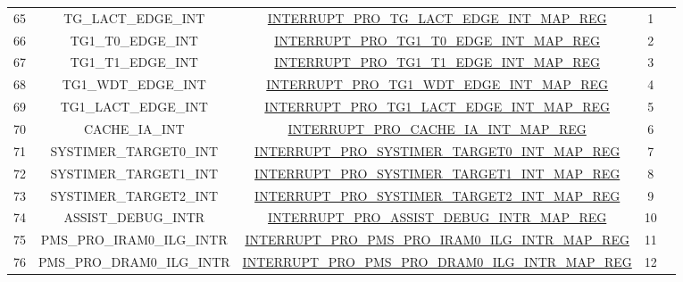\begin{footnotesize}
\begin{longtable}[c]{|*{5}{c|}}
    65 &TG\_LACT\_EDGE\_INT  &\hyperref[regdesc:INTERRUPTPROTGLACTEDGEINTMAPREG]{INTERRUPT\_PRO\_TG\_LACT\_EDGE\_INT\_MAP\_REG}  &1  &                          	\\
    \cline{1-4}
    66 &TG1\_T0\_EDGE\_INT  &\hyperref[regdesc:INTERRUPTPROTG1T0EDGEINTMAPREG]{INTERRUPT\_PRO\_TG1\_T0\_EDGE\_INT\_MAP\_REG}  &2  &                          	\\
    \cline{1-4}
    67 &TG1\_T1\_EDGE\_INT  &\hyperref[regdesc:INTERRUPTPROTG1T1EDGEINTMAPREG]{INTERRUPT\_PRO\_TG1\_T1\_EDGE\_INT\_MAP\_REG}  &3  &                          	\\
    \cline{1-4}
    68 &TG1\_WDT\_EDGE\_INT  &\hyperref[regdesc:INTERRUPTPROTG1WDTEDGEINTMAPREG]{INTERRUPT\_PRO\_TG1\_WDT\_EDGE\_INT\_MAP\_REG}  &4  &                          	\\
    \cline{1-4}
    69 &TG1\_LACT\_EDGE\_INT  &\hyperref[regdesc:INTERRUPTPROTG1LACTEDGEINTMAPREG]{INTERRUPT\_PRO\_TG1\_LACT\_EDGE\_INT\_MAP\_REG}  &5  &                          	\\
    \cline{1-4}
    70 &CACHE\_IA\_INT  &\hyperref[regdesc:INTERRUPTPROCACHEIAINTMAPREG]{INTERRUPT\_PRO\_CACHE\_IA\_INT\_MAP\_REG}  &6  &                          	\\
    \cline{1-4}
    71 &SYSTIMER\_TARGET0\_INT  &\hyperref[regdesc:INTERRUPTPROSYSTIMERTARGET0INTMAPREG]{INTERRUPT\_PRO\_SYSTIMER\_TARGET0\_INT\_MAP\_REG}  &7  &                          	\\
    \hline
    72 &SYSTIMER\_TARGET1\_INT  &\hyperref[regdesc:INTERRUPTPROSYSTIMERTARGET1INTMAPREG]{INTERRUPT\_PRO\_SYSTIMER\_TARGET1\_INT\_MAP\_REG}  &8  &                          	\\
    \cline{1-4}
    73 &SYSTIMER\_TARGET2\_INT  &\hyperref[regdesc:INTERRUPTPROSYSTIMERTARGET2INTMAPREG]{INTERRUPT\_PRO\_SYSTIMER\_TARGET2\_INT\_MAP\_REG}  &9  &                          	\\
    \cline{1-4}
    74 &ASSIST\_DEBUG\_INTR  &\hyperref[regdesc:INTERRUPTPROASSISTDEBUGINTRMAPREG]{INTERRUPT\_PRO\_ASSIST\_DEBUG\_INTR\_MAP\_REG}  &10  &                          	\\
    \cline{1-4}
    75 &PMS\_PRO\_IRAM0\_ILG\_INTR  &\hyperref[regdesc:INTERRUPTPROPMSPROIRAM0ILGINTRMAPREG]{INTERRUPT\_PRO\_PMS\_PRO\_IRAM0\_ILG\_INTR\_MAP\_REG}  &11  &                          	\\
    \cline{1-4}
    76 &PMS\_PRO\_DRAM0\_ILG\_INTR  &\hyperref[regdesc:INTERRUPTPROPMSPRODRAM0ILGINTRMAPREG]{INTERRUPT\_PRO\_PMS\_PRO\_DRAM0\_ILG\_INTR\_MAP\_REG}  &12  &                          	\\

\end{longtable}
\end{footnotesize}

